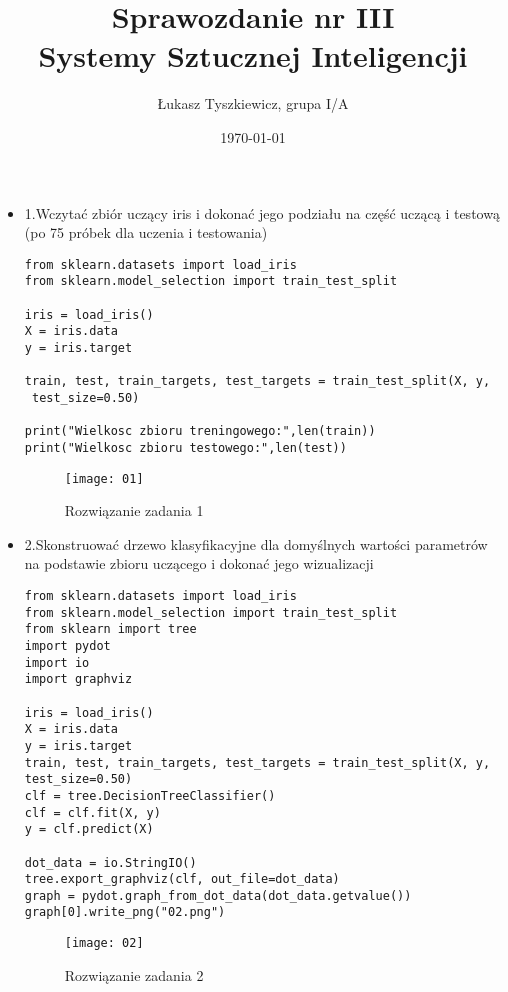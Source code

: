 \documentclass[12pt,a4paper]{article}
\begin{document}
	
	\title{Sprawozdanie nr III\\Systemy Sztucznej Inteligencji}
	\author{Łukasz Tyszkiewicz, grupa I/A}
	\date{\today}
	
	\maketitle
	\begin{itemize}
		\item 1.Wczytać zbiór uczący iris i dokonać jego podziału na część uczącą i testową (po 75 próbek dla uczenia i testowania) 
	\begin{lstlisting}
from sklearn.datasets import load_iris
from sklearn.model_selection import train_test_split

iris = load_iris()
X = iris.data
y = iris.target
 
train, test, train_targets, test_targets = train_test_split(X, y,
 test_size=0.50) 

print("Wielkosc zbioru treningowego:",len(train))
print("Wielkosc zbioru testowego:",len(test))                
	\end{lstlisting}
		\begin{figure}[h]
                        \texttt{[image: 01]}
                        \centering
			\caption{Rozwiązanie zadania 1}
			\label{fig:fig1}
                \end{figure}
                \clearpage 

                \item 2.Skonstruować drzewo klasyfikacyjne dla domyślnych wartości parametrów na podstawie zbioru uczącego i dokonać jego wizualizacji
	\begin{lstlisting}
from sklearn.datasets import load_iris
from sklearn.model_selection import train_test_split
from sklearn import tree
import pydot
import io
import graphviz
                
iris = load_iris()
X = iris.data
y = iris.target
train, test, train_targets, test_targets = train_test_split(X, y,       test_size=0.50)
clf = tree.DecisionTreeClassifier()
clf = clf.fit(X, y)
y = clf.predict(X)
                
dot_data = io.StringIO()
tree.export_graphviz(clf, out_file=dot_data)
graph = pydot.graph_from_dot_data(dot_data.getvalue())
graph[0].write_png("02.png")
                        \end{lstlisting}
		\begin{figure}[h]
                        \texttt{[image: 02]}
                        \centering
			\caption{Rozwiązanie zadania 2}
			\label{fig:fig2}
                \end{figure}
                \clearpage 


\end{itemize}
\end{document}
